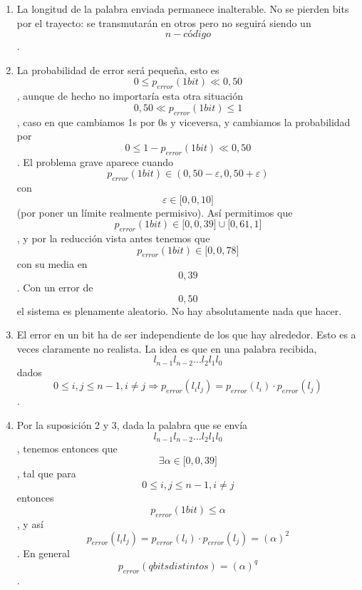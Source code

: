 \documentclass[
]{article}
\providecommand{\tightlist}{%
  \setlength{\itemsep}{0pt}\setlength{\parskip}{0pt}}
\begin{document}
\begin{enumerate}
\begin{enumerate}
\begin{enumerate}
      \begin{enumerate}
      \def\labelenumiv{\arabic{enumiv}.}
      \tightlist
      \item
        La longitud de la palabra enviada permanece inalterable. No se
        pierden bits por el trayecto: se transmutarán en otros pero no
        seguirá siendo un \[n - \mathit{código}\].
      \item
        La probabilidad de error será pequeña, esto
        es\[{0 \leq p_{\mathit{error}}}{{({1\mathit{bit}})} \ll 0,50}\],
        aunque de hecho no importaría esta otra
        situación\[{0,50 \ll p_{\mathit{error}}}{{({1\mathit{bit}})} \leq 1}\],
        caso en que cambiamos 1s por 0s y viceversa, y cambiamos la
        probabilidad por
        \[{0 \leq {1 - p_{\mathit{error}}}}{{({1\mathit{bit}})} \ll 0,50}\].
        El problema grave aparece cuando
        \[p_{\mathit{error}}{{({1\mathit{bit}})} \in \left( {{0,50 - \varepsilon},{0,50 + \varepsilon}} \right)}\]
        con \[\varepsilon \in {\lbrack{0,0,10}\rbrack}\](por poner un
        límite real\-mente permisivo). Así permitimos
        que\[p_{\mathit{error}}{{({1\mathit{bit}})} \in {{\lbrack{0,0,39}\rbrack} \cup {\lbrack{0,61,1}\rbrack}}}\],
        y por la reducción vista antes tenemos que
        \[p_{\mathit{error}}{{({1\mathit{bit}})} \in {\lbrack{0,0,78}\rbrack}}\]con
        su media en \[0,39\]. Con un error de \[0,50\]el sistema es
        plenamente aleatorio. No hay absolutamente nada que hacer.
      \item
        El error en un bit ha de ser independiente de los que hay
        alrededor. Esto es a ve\-ces claramente no realista. La idea es
        que en una palabra recibida,
        \[l_{n - 1}l_{n - 2}\ldots l_{2}l_{1}l_{0}\]dados
        \[{0 \leq i},{j \leq {n - 1}},{i \neq j}\Rightarrow p_{\mathit{error}}{{({l_{i}l_{j}})} = p_{\mathit{error}}}{{(l_{i})} \cdot p_{\mathit{error}}}{(l_{j})}\].
      \item
        Por la suposición 2 y 3, dada la palabra que se envía
        \[l_{n - 1}l_{n - 2}\ldots l_{2}l_{1}l_{0}\], tene\-mos entonces
        que \[\exists{\alpha \in {\lbrack{0,0,39}\rbrack}}\], tal que
        para \[{0 \leq i},{j \leq {n - 1}},{i \neq j}\] entonces
        \[p_{\mathit{error}}{{({1\mathit{bit}})} \leq \alpha}\], y así
        \[p_{\mathit{error}}{{({l_{i}l_{j}})} = p_{\mathit{error}}}{{(l_{i})} \cdot p_{\mathit{error}}}{{(l_{j})} = {(\alpha)}^{2}}\].
        En general
        \[p_{\mathit{error}}{\left( {q\mathit{bits}\mathit{distintos}} \right) = \left( \alpha \right)^{q}}\].

\end{enumerate}
\end{enumerate}
\end{enumerate}
\end{enumerate}
\end{document}
